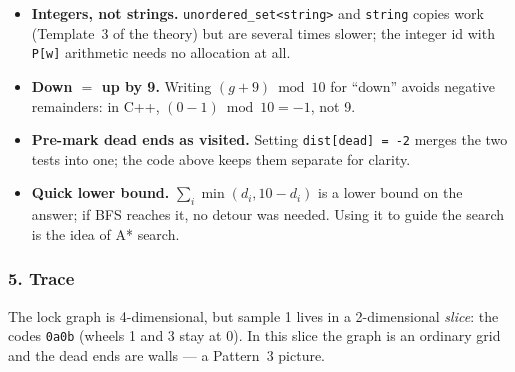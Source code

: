 \begin{tricksbox}
\begin{itemize}[leftmargin=*]
    \item \textbf{Integers, not strings.} \texttt{unordered\_set<string>} and \texttt{string} copies work (Template~3 of the theory) but are several times slower; the integer id with \texttt{P[w]} arithmetic needs no allocation at all.
    \item \textbf{Down $=$ up by 9.} Writing $(g + 9) \bmod 10$ for ``down'' avoids negative remainders: in C++, $(0 - 1) \bmod 10 = -1$, not 9.
    \item \textbf{Pre-mark dead ends as visited.} Setting \texttt{dist[dead] = -2} merges the two tests into one; the code above keeps them separate for clarity.
    \item \textbf{Quick lower bound.} $\sum_i \min(d_i, 10-d_i)$ is a lower bound on the answer; if BFS reaches it, no detour was needed. Using it to guide the search is the idea of A* search.
\end{itemize}
\end{tricksbox}

\subsubsection*{5. Trace}

The lock graph is 4-dimensional, but sample 1 lives in a 2-dimensional \emph{slice}: the codes \texttt{0a0b} (wheels 1 and 3 stay at 0). In this slice the graph is an ordinary grid and the dead ends are walls --- a Pattern~3 picture.

